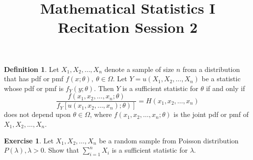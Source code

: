 \documentclass{article}
\title{Mathematical Statistics I\\ Recitation Session 2}
\date{}
\theoremstyle{definition}
\newtheorem*{definition*}{Definition}
\newtheorem*{exercise*}{Exercise}
\begin{document}
	\maketitle
	\begin{definition*}
	Let $X_1, X_2, \ldots, X_n$ denote a sample of size $n$ from a distribution that has pdf or pmf $f(x ; \theta), \ \theta \in \Omega$. Let $Y=u\left(X_1, X_2, \ldots, X_n\right)$ be a statistic whose pdf or pmf is $f_{Y}\left(y; \theta\right)$. Then $Y$ is a sufficient statistic for $\theta$ if and only if
	$$
	\frac{f\left(x_1, x_2, \ldots, x_n ; \theta\right)}{\left.f_{Y}\left[u\left(x_1, x_2, \ldots, x_n\right) ; \theta\right)\right]}=H\left(x_1, x_2, \ldots, x_n\right)
	$$
	does not depend upon $\theta \in \Omega$, where $f\left(x_1, x_2, \ldots, x_n ; \theta\right)$ is the joint pdf or pmf of $X_1, X_2, \ldots, X_n$.
	\end{definition*}
	
	\begin{exercise*}
	Let $X_1, X_2, \ldots, X_n$ be a random sample from Poisson distribution $P(\lambda), \lambda > 0$. Show that $\sum_{i=1}^n X_i$ is a sufficient statistic for $\lambda$.
	\end{exercise*}
	
\end{document}
